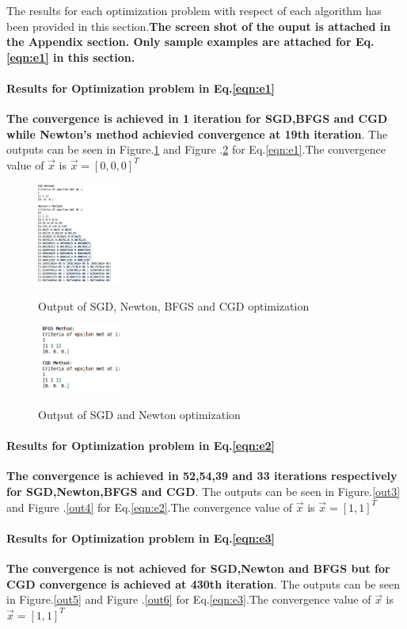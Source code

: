 \documentclass[paper=a4, fontsize=11pt]{scrartcl}
\numberwithin{equation}{section}		%
\numberwithin{figure}{section}			%
\numberwithin{table}{section}				%
\begin{document}
The results for each optimization problem with respect of each algorithm has been provided in this section.\textbf{The screen shot of the ouput is attached in the Appendix section. Only sample examples are attached for Eq.\ref{eqn:e1} in this section.}

\paragraph{Results for Optimization problem in Eq.\ref{eqn:e1}\newline}
\textbf{The convergence is achieved in 1 iteration for SGD,BFGS and CGD while Newton's method achievied convergence at 19th iteration}. The outputs can be seen in Figure.\ref{out1} and Figure .\ref{out2} for Eq.\ref{eqn:e1}.The convergence value of $\vec{x}$ is $\vec{x}=[0,0,0]^T$
\begin{figure}[H]
\caption{Output of SGD, Newton, BFGS and CGD optimization}
\centering
\includegraphics[width=0.25\textwidth]{out1.png}
\label{out1}
\end{figure}
\begin{figure}[H]
\caption{Output of SGD and Newton optimization}
\centering
\includegraphics[width=0.25\textwidth]{out2.png}
\label{out2}
\end{figure}
\paragraph{Results for Optimization problem in Eq.\ref{eqn:e2}\newline}
\textbf{The convergence is achieved in 52,54,39 and 33 iterations respectively for SGD,Newton,BFGS and CGD}. The outputs can be seen in Figure.\ref{out3} and Figure .\ref{out4} for Eq.\ref{eqn:e2}.The convergence value of $\vec{x}$ is $\vec{x}=[1,1]^T$
\paragraph{Results for Optimization problem in Eq.\ref{eqn:e3}\newline}
\textbf{The convergence is not achieved for SGD,Newton and BFGS but for CGD convergence is achieved at 430th iteration}. The outputs can be seen in Figure.\ref{out5} and Figure .\ref{out6} for Eq.\ref{eqn:e3}.The convergence value of $\vec{x}$ is $\vec{x}=[1,1]^T$
\end{document}
